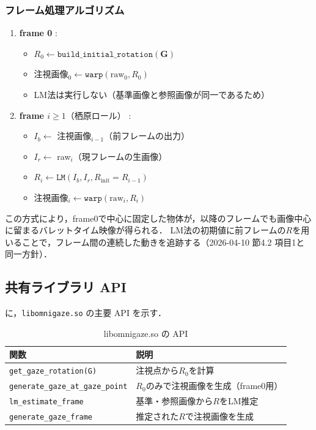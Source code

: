 \documentclass{ltjsarticle}          %
\begin{document}
\subsubsection{フレーム処理アルゴリズム}
\label{subsec:frame_algo}
\begin{enumerate}
  \item \textbf{frame 0} :
    \begin{itemize}
      \item $R_0 \leftarrow \texttt{build\_initial\_rotation}(\bm{G})$
      \item 注視画像$_0 \leftarrow \texttt{warp}(\text{raw}_0, R_0)$
      \item LM法は実行しない（基準画像と参照画像が同一であるため）
    \end{itemize}

  \item \textbf{frame $i \geq 1$}（栖原ロール） :
    \begin{itemize}
      \item $I_b \leftarrow$ 注視画像$_{i-1}$（前フレームの出力）
      \item $I_r \leftarrow$ raw$_i$（現フレームの生画像）
      \item $R_i \leftarrow \texttt{LM}(I_b, I_r, R_{\mathrm{init}} = R_{i-1})$
      \item 注視画像$_i \leftarrow \texttt{warp}(\text{raw}_i, R_i)$
    \end{itemize}
\end{enumerate}

この方式により，frame0で中心に固定した物体が，以降のフレームでも画像中心に留まるバレットタイム映像が得られる．
LM法の初期値に前フレームの$R$を用いることで，フレーム間の連続した動きを追跡する（2026-04-10 節4.2 項目1と同一方針）．

\subsection{共有ライブラリ API}
に，\texttt{libomnigaze.so} の主要 API を示す．

\begin{table}[H]
  \centering
  \caption{libomnigaze.so の API}
  \label{tab:api}
  \begin{tabular}{l|p{8cm}}
    \hline
    関数 & 説明 \\
    \hline
    \texttt{get\_gaze\_rotation(G)} & 注視点から$R_0$を計算 \\
    \texttt{generate\_gaze\_at\_gaze\_point} & $R_0$のみで注視画像を生成（frame0用） \\
    \texttt{lm\_estimate\_frame} & 基準・参照画像から$R$をLM推定 \\
    \texttt{generate\_gaze\_frame} & 推定された$R$で注視画像を生成 \\
    \hline
  \end{tabular}
\end{table}
\end{document}
